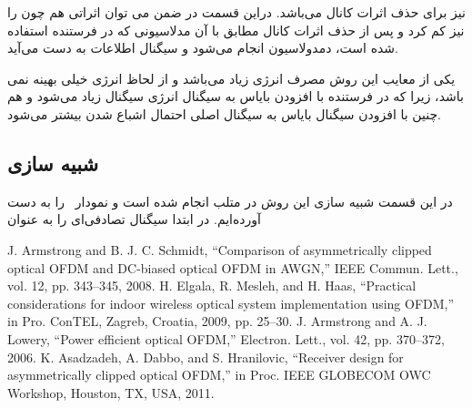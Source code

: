 \documentclass{article}
\begin{document}
 نیز برای حذف اثرات کانال می‌باشد. دراین قسمت در ضمن می توان اثراتی هم چون  را نیز کم کرد و پس از حذف اثرات کانال مطابق با آن مدلاسیونی که در فرستنده استفاده شده است، دمدولاسیون انجام می‌شود و سیگنال اطلاعات به دست می‌آید.  

یکی از معایب این روش مصرف انرژی زیاد می‌باشد و از لحاظ انرژی خیلی بهینه نمی باشد، زیرا که در فرستنده با افزودن بایاس به سیگنال انرژی سیگنال زیاد می‌شود و هم چنین با افزودن سیگنال بایاس به سیگنال اصلی احتمال اشباع شدن بیشتر می‌شود.


\subsection{شبیه سازی}
در این قسمت شبیه سازی این روش در متلب انجام شده است و نمودار \ را به دست آورده‌ایم. در ابتدا سیگنال تصادفی‌ای را به عنوان 

\setLTRbibitems
\begin{thebibliography}{9}
\resetlatinfont
{}
J. Armstrong and B. J. C. Schmidt, “Comparison of asymmetrically
clipped optical OFDM and DC-biased optical OFDM in AWGN,”
IEEE Commun. Lett., vol. 12, pp. 343–345, 2008.
H. Elgala, R. Mesleh, and H. Haas, “Practical considerations for indoor wireless optical system implementation using OFDM,” in Pro.
ConTEL, Zagreb, Croatia, 2009, pp. 25–30.
J. Armstrong and A. J. Lowery, “Power efficient optical OFDM,” Electron. Lett., vol. 42, pp. 370–372, 2006.
K. Asadzadeh, A. Dabbo, and S. Hranilovic, “Receiver design for
asymmetrically clipped optical OFDM,” in Proc. IEEE GLOBECOM
OWC Workshop, Houston, TX, USA, 2011.
\end{thebibliography}
\end{document}
